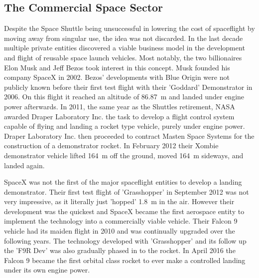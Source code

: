 \subsection{The Commercial Space Sector}

Despite the Space Shuttle being unsuccessful in lowering the cost of spaceflight by moving away from singular use, the idea was not discarded. In the last decade multiple private entities discovered a viable business model in the development and flight of reusable space launch vehicles. Most notably, the two billionaires Elon Musk and Jeff Bezos took interest in this concept. Musk founded his company SpaceX in 2002. Bezos' developments with Blue Origin were not publicly known before their first test flight with their 'Goddard' Demonstrator in 2006. On this flight it reached an altitude of \SI{86.87}{\meter} and landed under engine power afterwards.\cite{bezos-goddard} In 2011, the same year as the Shuttles retirement, NASA awarded Draper Laboratory Inc. the task to develop a flight control system capable of flying and landing a rocket type vehicle, purely under engine power. Draper Laboratory Inc. then proceeded to contract Masten Space Systems for the construction of a demonstrator rocket. In February 2012 their Xombie demonstrator vehicle lifted \SI{164}{\meter} off the ground, moved \SI{164}{\meter} sideways, and landed again.\cite{xombie} 

SpaceX was not the first of the major spaceflight entities to develop a landing demonstrator. Their first test flight of 'Grasshopper' in September 2012 was not very impressive, as it literally just 'hopped' \SI{1.8}{\meter} in the air. However their development was the quickest and SpaceX became the first aerospace entity to implement the technology into a commercially viable vehicle. Their Falcon 9 vehicle had its maiden flight in 2010 and was continually upgraded over the following years. The technology developed with 'Grasshopper' and its follow up the 'F9R Dev' was also gradually phased in to the rocket. In April 2016 the Falcon 9 became the first orbital class rocket to ever make a controlled landing under its own engine power.\cite{spacex-wiki}

